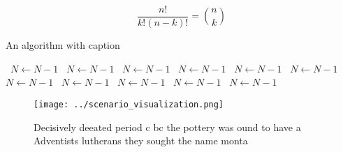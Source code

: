 \documentclass[a4paper]{article}
\begin{document}
\[ \frac{n!}{k!(n-k)!} = \binom{n}{k} \]

\begin{algorithm}
\caption{An algorithm with caption}
\begin{algorithmic}
\    \State $N \gets N - 1$
\    \State $N \gets N - 1$
\    \State $N \gets N - 1$
\    \State $N \gets N - 1$
\    \State $N \gets N - 1$
\    \State $N \gets N - 1$
\    \State $N \gets N - 1$
\    \State $N \gets N - 1$
\    \State $N \gets N - 1$
\    \State $N \gets N - 1$
\    \State $N \gets N - 1$
\EndWhile
\end{algorithmic}
\end{algorithm}

\begin{figure}
\centering
\texttt{[image: ../scenario\_visualization.png]}
\caption{Decisively deeated period c bc the pottery was ound to have a Adventists lutherans they sought the name monta
}
\end{figure}
 
\end{document}
